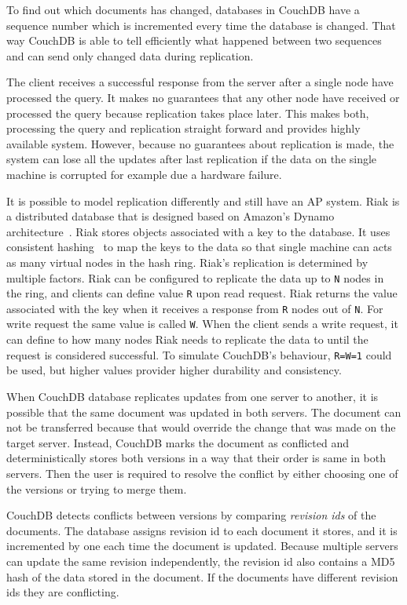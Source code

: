 To find out which documents has changed, databases in CouchDB have a sequence
number which is incremented every time the database is changed. That way CouchDB
is able to tell efficiently what happened between two sequences and can send
only changed data during replication.

The client receives a successful response from the server after a single node
have processed the query. It makes no guarantees that any other node have
received or processed the query because replication takes place later. This
makes both, processing the query and replication straight forward and provides
highly available system. However, because no guarantees about replication is
made, the system can lose all the updates after last replication if the data on
the single machine is corrupted for example due a hardware failure.

It is possible to model replication differently and still have an AP system.
Riak is a distributed database that is designed based on Amazon's Dynamo
architecture~\cite{decandia2007dynamo}. Riak stores objects associated with a key
to the database. It uses consistent hashing~\cite{karger1997consistent} to map
the keys to the data so that single machine can acts as many virtual nodes in
the hash ring. Riak's replication is determined by multiple factors. Riak can be
configured to replicate the data up to \texttt{N} nodes in the ring, and clients
can define value \texttt{R} upon read request. Riak returns the value associated
with the key when it receives a response from \texttt{R} nodes out of \texttt{N}.
For write request the same value is called \texttt{W}. When the client sends a
write request, it can define to how many nodes Riak needs to replicate the data
to until the request is considered successful. To simulate CouchDB's behaviour,
\texttt{R=W=1} could be used, but higher values provider higher durability and
consistency.

When CouchDB database replicates updates from one server to another, it is
possible that the same document was updated in both servers. The document can
not be transferred because that would override the change that was made on the
target server. Instead, CouchDB marks the document as conflicted and
deterministically stores both versions in a way that their order is same in both
servers. Then the user is required to resolve the conflict by either choosing
one of the versions or trying to merge them.

CouchDB detects conflicts between versions by comparing \emph{revision ids} of
the documents. The database assigns revision id to each document it stores, and
it is incremented by one each time the document is updated. Because multiple
servers can update the same revision independently, the revision id also
contains a MD5 hash of the data stored in the document. If the documents have
different revision ids they are conflicting. 

